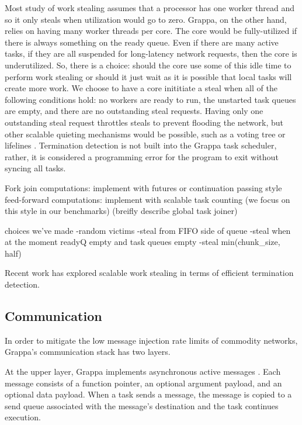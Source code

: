 Most study of work stealing assumes that a processor has one worker
thread and so it only steals when utilization would go to zero. 
Grappa, on the other hand, relies on having many worker threads per core. The
core would be fully-utilized if there is always something on the ready
queue. Even if there are many active tasks, if they are all suspended
for long-latency network requests, then the core is underutilized.
So, there is a choice: should the core use some of this idle time to
perform work stealing or should it just wait as it is possible that local tasks will
create more work. We choose to have a core inititiate a steal when all
of the following conditions hold: no workers are ready to run, 
the unstarted task queues are empty, and there are no outstanding steal requests. 
Having only one outstanding steal request throttles steals to
prevent flooding the network, but other scalable quieting mechanisms
would be possible, such as a voting tree\cite{scalableWorkStealingOrCilk98}
or lifelines \cite{lifelines}. Termination detection is not
built into the Grappa task scheduler, rather, it is considered a programming error for
the program to exit without syncing all tasks.

Fork join computations: implement with futures or continuation passing
style
feed-forward computations: implement with scalable task counting (we
focus on this style in our benchmarks)
(breifly describe global task joiner)

choices we've made
-random victims
-steal from FIFO side of queue
-steal when at the moment readyQ empty and task queues empty
-steal min(chunk\_size, half)

Recent work has explored scalable work stealing in terms of efficient
termination detection. 



\subsection{Communication}

In order to mitigate the low message injection rate limits of commodity
networks, Grappa's communication stack has two layers. 

At the upper layer, Grappa implements asynchronous active messages
. Each message consists of a function pointer, an
optional argument payload, and an optional data payload. When a task
sends a message, the message is copied to a send queue associated with
the message's destination and the task continues execution.


